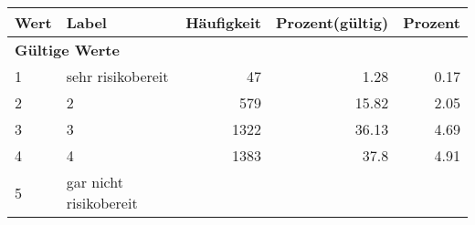      \begin{longtable}{lXrrr}
     \toprule
     \textbf{Wert} & \textbf{Label} & \textbf{Häufigkeit} & \textbf{Prozent(gültig)} & \textbf{Prozent} \\
     \endhead
     \midrule
     \multicolumn{5}{l}{\textbf{Gültige Werte}}\\

     1 &
     \multicolumn{1}{X}{ sehr risikobereit   } &


       \num{47} &
       \num[round-mode=places,round-precision=2]{1.28} &
         \num[round-mode=places,round-precision=2]{0.17} \\

     2 &
     \multicolumn{1}{X}{ 2   } &


       \num{579} &
       \num[round-mode=places,round-precision=2]{15.82} &
         \num[round-mode=places,round-precision=2]{2.05} \\

     3 &
     \multicolumn{1}{X}{ 3   } &


       \num{1322} &
       \num[round-mode=places,round-precision=2]{36.13} &
         \num[round-mode=places,round-precision=2]{4.69} \\

     4 &
     \multicolumn{1}{X}{ 4   } &


       \num{1383} &
       \num[round-mode=places,round-precision=2]{37.8} &
         \num[round-mode=places,round-precision=2]{4.91} \\

     5 &
     \multicolumn{1}{X}{ gar nicht risikobereit   } &



\end{longtable}
